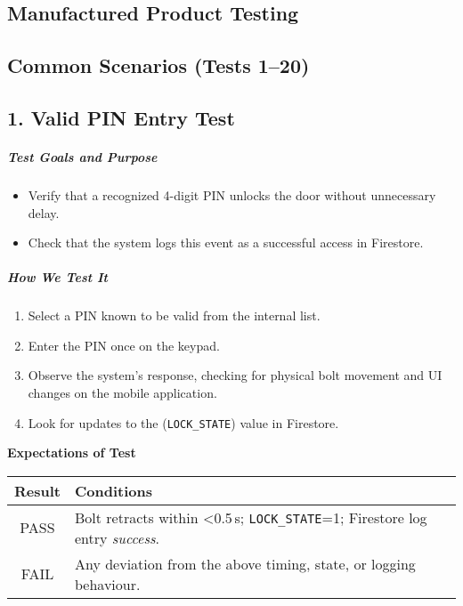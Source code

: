 \newpage
\begin{samepage}
    \section{Manufactured Product Testing}
    \subsection{Common Scenarios (Tests 1–20)}
    \subsection*{1. Valid PIN Entry Test}
    \subparagraph{Test Goals and Purpose}
    \begin{itemize}
        \item Verify that a recognized 4-digit PIN unlocks the door without unnecessary delay.
        \item Check that the system logs this event as a successful access in Firestore.
    \end{itemize}
    \subparagraph{How We Test It}
    \begin{enumerate}
        \item Select a PIN known to be valid from the internal list.
        \item Enter the PIN once on the keypad.
        \item Observe the system's response, checking for physical bolt movement and UI changes on the mobile application.
        \item Look for updates to the (\texttt{LOCK\_STATE}) value in Firestore.
    \end{enumerate}
    
    \textbf{Expectations of Test}
    \begin{center}
    \begin{tabular}{|c|p{10cm}|}
      \hline
      \textbf{Result} & \textbf{Conditions} \\
      \hline
      PASS & Bolt retracts within \textless{}0.5\,s; \texttt{LOCK\_STATE}=1; Firestore log entry \emph{success}. \\
      \hline
      FAIL & Any deviation from the above timing, state, or logging behaviour. \\
      \hline
    \end{tabular}
    \end{center}
\end{samepage}


